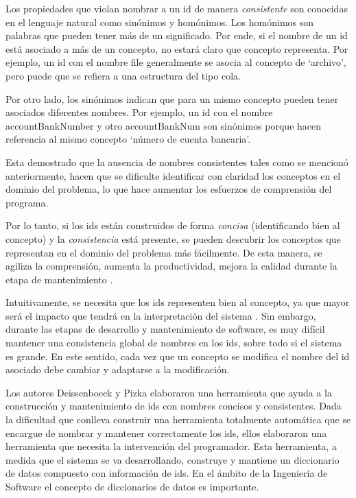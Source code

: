 Los propiedades que violan nombrar a un id de manera \textit{consistente} son conocidas en el lenguaje natural como sinónimos y homónimos. 
Los homónimos son palabras que pueden tener más de un significado. Por ende, si el nombre de un id está asociado a más de un concepto, no estará claro que concepto representa. Por ejemplo, un id con el nombre \textsf{file} generalmente se asocia al concepto de `archivo', pero puede que se refiera a una estructura del tipo cola.

Por otro lado, los sinónimos indican que para un mismo concepto pueden tener asociados diferentes nombres. Por ejemplo, un id con el nombre \mbox{\textsf{accountBankNumber}} y otro \textsf{accountBankNum} son sinónimos porque hacen referencia al mismo concepto `número de cuenta bancaria'. 

Esta demostrado \cite{DFPM05,DLHD06,DMDJ13} que la ausencia de nombres consistentes tales como se mencionó anteriormente, hacen que se dificulte identificar con claridad los conceptos en el dominio del problema, lo que hace aumentar los esfuerzos de comprensión del programa. 


Por lo tanto, si los ids están construidos de forma \textit{concisa} (identificando bien al concepto) y la \textit{consistencia} está presente, se pueden descubrir los conceptos que representan en el dominio del problema más fácilmente. De esta manera, se agiliza la comprensión, aumenta la productividad, mejora la calidad durante la etapa de mantenimiento \cite{DFPM05,DLHD06}.%

Intuitivamente, se necesita que los ids representen bien al concepto, ya que mayor será el impacto que tendrá en la interpretación del sistema \cite{DFPM05,DLHD06}. Sin embargo, durante las etapas de desarrollo y mantenimiento de software, es muy difícil mantener una consistencia global de nombres en los ids, sobre todo si el sistema es grande. En este sentido, cada vez que un concepto se modifica el nombre del id asociado debe cambiar y adaptarse a la modificación.

Los autores Deissenboeck y Pizka \cite{DFPM05} elaboraron una herramienta que ayuda a la construcción y mantenimiento de ids con nombres concisos y consistentes. Dada la dificultad que conlleva construir una herramienta totalmente automática que se encargue de nombrar y mantener correctamente los ids, ellos elaboraron una herramienta que necesita la intervención del programador. Esta herramienta, a medida que el sistema se va desarrollando, construye y mantiene un diccionario de datos compuesto con información de ids. En el ámbito de la Ingeniería de Software el concepto de diccionarios de datos es importante.


